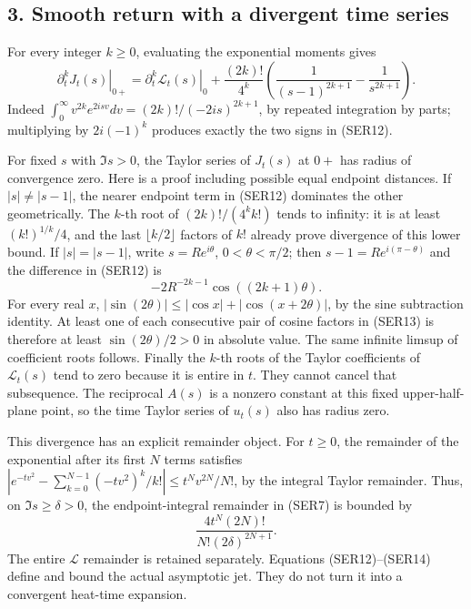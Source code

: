 \documentclass[
  10pt,
  a4paper,
]{article}
\begin{document}
\subsection{3. Smooth return with a divergent time
series}\label{smooth-return-with-a-divergent-time-series}

For every integer \(k\ge0\), evaluating the exponential moments gives \[
\left.\partial_t^k J_t(s)\right|_{0+}
=\left.\partial_t^k\mathcal L_t(s)\right|_0
+\frac{(2k)!}{4^k}
 \left(\frac1{(s-1)^{2k+1}}-\frac1{s^{2k+1}}\right).
\tag{SER12}
\] Indeed \(\int_0^\infty v^{2k}e^{2isv}dv=(2k)!/(-2is)^{2k+1}\), by
repeated integration by parts; multiplying by \(2i(-1)^k\) produces
exactly the two signs in (SER12).

For fixed \(s\) with \(\Im s>0\), the Taylor series of \(J_t(s)\) at
\(0+\) has radius of convergence zero. Here is a proof including
possible equal endpoint distances. If \(|s|\ne|s-1|\), the nearer
endpoint term in (SER12) dominates the other geometrically. The \(k\)-th
root of \((2k)!/(4^k k!)\) tends to infinity: it is at least
\((k!)^{1/k}/4\), and the last \(\lfloor k/2\rfloor\) factors of \(k!\)
already prove divergence of this lower bound. If \(|s|=|s-1|\), write
\(s=R e^{i\theta}\), \(0<\theta<\pi/2\); then
\(s-1=R e^{i(\pi-\theta)}\) and the difference in (SER12) is \[
-2R^{-2k-1}\cos((2k+1)\theta).
\tag{SER13}
\] For every real \(x\),
\(|\sin(2\theta)|\le|\cos x|+|\cos(x+2\theta)|\), by the sine
subtraction identity. At least one of each consecutive pair of cosine
factors in (SER13) is therefore at least \(\sin(2\theta)/2>0\) in
absolute value. The same infinite limsup of coefficient roots follows.
Finally the \(k\)-th roots of the Taylor coefficients of
\(\mathcal L_t(s)\) tend to zero because it is entire in \(t\). They
cannot cancel that subsequence. The reciprocal \(A(s)\) is a nonzero
constant at this fixed upper-half-plane point, so the time Taylor series
of \(u_t(s)\) also has radius zero.

This divergence has an explicit remainder object. For \(t\ge0\), the
remainder of the exponential after its first \(N\) terms satisfies
\(|e^{-tv^2}-\sum_{k=0}^{N-1}(-tv^2)^k/k!|\le t^Nv^{2N}/N!\), by the
integral Taylor remainder. Thus, on \(\Im s\ge\delta>0\), the
endpoint-integral remainder in (SER7) is bounded by \[
\frac{4t^N(2N)!}{N!(2\delta)^{2N+1}}.
\tag{SER14}
\] The entire \(\mathcal L\) remainder is retained separately. Equations
(SER12)--(SER14) define and bound the actual asymptotic jet. They do not
turn it into a convergent heat-time expansion.
\end{document}
